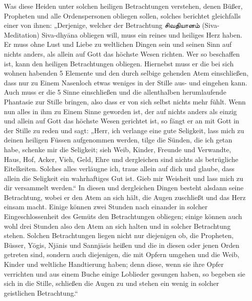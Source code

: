 \documentclass{article}
\newcommand{\TamilText}[1]{\texttamil{#1}}
\newcommand{\tam}[1]{\TamilText{#1}}
\begin{document}
Was diese Heiden unter solchen heiligen Betrachtungen verstehen, denen Büßer, Propheten und alle Ordenspersonen obliegen sollen, solches berichtet gleichfalls einer von ihnen: „Derjenige, welcher der Betrachtung \tam{சிவதியானம்} (Siva-Meditation) Siva-dhy\={a}na obliegen will, muss ein reines und heiliges Herz haben. Er muss ohne Lust und Liebe zu weltlichen Dingen sein und seinen Sinn auf nichts anders, als allein auf Gott das höchste Wesen richten. Wer so beschaffen ist, kann den heiligen Betrachtungen obliegen. Hiernebst muss er die bei sich wohnen habenden 5 Elemente und den durch selbige gehenden Atem einschließen, dass nur zu Einem Nasenloch etwas weniges in der Stille aus- und eingehen kann. Auch muss er die 5 Sinne einschließen und die allenthalben herumlaufende Phantasie zur Stille bringen, also dass er von sich selbst nichts mehr fühlt. Wenn nun alles in ihm zu Einem Sinne geworden ist, der auf nichts anders als einzig und allein auf Gott das höchste Wesen gerichtet ist, so fängt er an mit Gott in der Stille zu reden und sagt: „Herr, ich verlange eine gute Seligkeit, lass mich zu deinen heiligen Füssen aufgenommen werden, tilge die Sünden, die ich getan habe, schenke mir die Seligkeit; sieh Weib, Kinder, Freunde und Verwandte, Haus, Hof, Acker, Vieh, Geld, Ehre und dergleichen sind nichts als betrügliche Eitelkeiten. Solches alles verläugne ich, traue allein auf dich und glaube, dass allein die Seligkeit ein wahrhaftiges Gut ist. Gieb mir Weisheit und lass mich zu dir versammelt werden.“ In diesen und dergleichen Dingen besteht alsdann seine Betrachtung, wobei er den Atem an sich hält, die Augen zuschließt und das Herz einsam macht. Einige können zwei Stunden nach einander in solcher Eingeschlossenheit des Gemüts den Betrachtungen obliegen; einige können auch wohl drei Stunden also den Atem an sich halten und in solcher Betrachtung stehen. Solchen Betrachtungen liegen nicht nur diejenigen ob, die Propheten, Büsser, Y\={o}gis, Nj\={a}nis und Sannj\={a}sis heißen und die in diesen oder jenen Orden getreten sind, sondern auch diejenigen, die mit Opfern umgehen und die Weib, Kinder und weltliche Handtierung haben; denn diese, wenn sie ihre Opfer verrichten und aus einem Buche einige Loblieder gesungen haben, so begeben sie sich in die Stille, schließen die Augen zu und stehen ein wenig in solcher geistlichen Betrachtung.“
\end{document}
